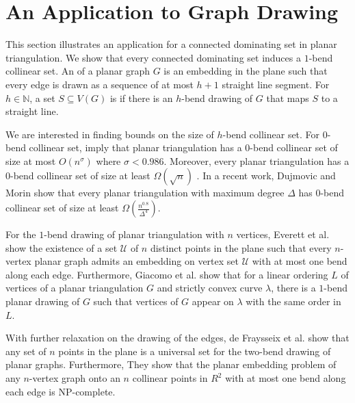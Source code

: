 \section{An Application to Graph Drawing}
This section illustrates an application for a connected dominating set in planar triangulation. We show that every connected dominating set induces a $1$-bend collinear set. An  of a planar graph $G$ is an embedding in the plane such that every edge is drawn as a sequence of at most $h + 1$ straight line segment. For $h \in \mathbb{N}$, a set $S \subseteq V(G)$ is  if there is an $h$-bend drawing of $G$ that maps $S$ to a straight line.

We are interested in finding bounds on the size of $h$-bend collinear set. For $0$-bend collinear set, \cite{DBLP:journals/jct/GrunbaumW73}\cite{DBLP:conf/wg/RavskyV11}\cite{DBLP:journals/jocg/LozzoDFMR18} imply that planar triangulation has a 0-bend collinear set of size at most $O(n^{\sigma})$ where $\sigma < 0.986$. Moreover, every planar triangulation has a 0-bend collinear set of size at least $\Omega(\sqrt{n})$ \cite{DBLP:journals/dcg/BoseDHLMW09} \cite{DBLP:journals/jgaa/Dujmovic17}. In a recent work, Dujmovic and Morin \cite{DBLP:conf/compgeom/DujmovicM19} show that every planar triangulation with maximum degree $\Delta$ has $0$-bend collinear set of size at least $\Omega(\frac{n^{0.8}}{\Delta^4})$.

For the $1$-bend drawing of planar triangulation with $n$ vertices,  Everett et al. \cite{DBLP:conf/gd/EverettLLW07} show the existence of a set $\mathcal{U}$ of $n$ distinct points in the plane such that every $n$-vertex planar graph admits an embedding on vertex set $\mathcal{U}$ with at most one bend along each edge. Furthermore, Giacomo et al. \cite{DBLP:journals/comgeo/GiacomoDLW05} show that for a linear ordering $L$ of vertices of a planar triangulation $G$ and strictly convex curve $\lambda$, there is a $1$-bend planar drawing of $G$ such that vertices of $G$ appear on $\lambda$ with the same order in $L$.

With further relaxation on the drawing of the edges, de Fraysseix et al. \cite{DBLP:journals/combinatorica/FraysseixPP90} show that any set of $n$ points in the plane is a universal set for the two-bend drawing of planar graphs. Furthermore, They show that the planar embedding problem of any $n$-vertex graph onto an $n$ collinear points in $R^2$ with at most one bend along each edge is NP-complete.

